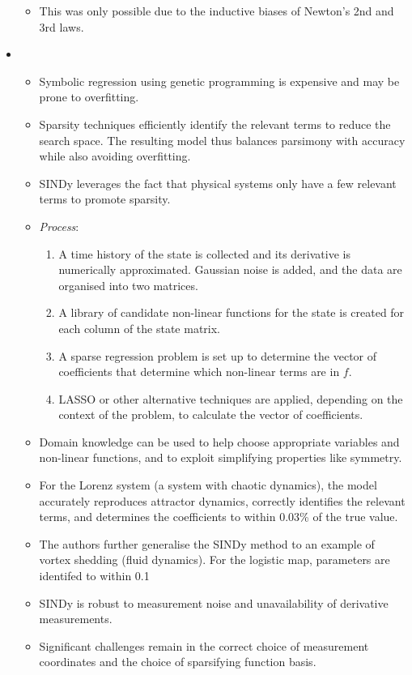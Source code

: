 \documentclass[fleqn,10pt]{olplainarticle}
\begin{document}
\begin{itemize}
\begin{itemize}
\begin{itemize}
                    \end{itemize}
              \item This was only possible due to the inductive biases of Newton's 2nd and 3rd laws.
          \end{itemize}
    \item {}
            \begin{itemize}
                \item Symbolic regression using genetic programming is expensive and may be prone to overfitting.
                \item Sparsity techniques efficiently identify the relevant terms to reduce the search space. The resulting model thus balances parsimony with accuracy while also avoiding overfitting.
                \item SINDy leverages the fact that physical systems only have a few relevant terms to promote sparsity.
                \item \emph{Process}:
                    \begin{enumerate}
                        \item A time history of the state is collected and its derivative is numerically approximated. Gaussian noise is added, and the data are organised into two matrices.
                        \item A library of candidate non-linear functions for the state is created for each column of the state matrix.
                        \item A sparse regression problem is set up to determine the vector of coefficients that determine which non-linear terms are in $f$.
                        \item LASSO or other alternative techniques are applied, depending on the context of the problem, to calculate the vector of coefficients.
                    \end{enumerate}
                \item Domain knowledge can be used to help choose appropriate variables and non-linear functions, and to exploit simplifying properties like symmetry.
                \item For the Lorenz system (a system with chaotic dynamics), the model accurately reproduces attractor dynamics, correctly identifies the relevant terms, and determines the coefficients to within 0.03\% of the true value.
                \item The authors further generalise the SINDy method to an example of vortex shedding (fluid dynamics). For the logistic map, parameters are identifed to within 0.1%
                \item SINDy is robust to measurement noise and unavailability of derivative measurements.
                \item Significant challenges remain in the correct choice of measurement coordinates and the choice of sparsifying function basis.
            \end{itemize}
\end{itemize}
\end{document}
